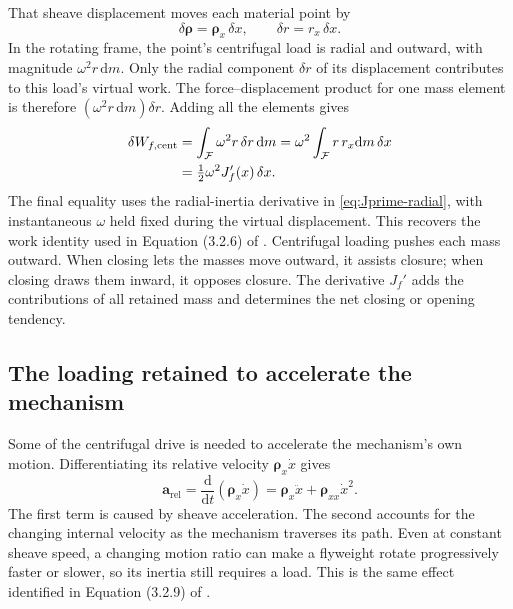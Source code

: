 \documentclass[11pt,letterpaper]{article}
\numberwithin{equation}{section}
\newcommand{\dd}{\mathrm{d}}
\newcommand{\rhoo}{\bm\rho}
\newcommand{\half}{\tfrac12}
\newcommand{\source}{\cite{formulation}}
\begin{document}
That sheave displacement moves each material point by
\begin{equation}
  \delta\rhoo=\rhoo_x\,\delta x,
  \qquad \delta r=r_x\,\delta x.
  \label{eq:virtual-displacement}
\end{equation}
In the rotating frame, the point's centrifugal load is radial and outward, with magnitude $\omega^2r\,\dd m$. Only the radial component $\delta r$ of its displacement contributes to this load's virtual work. The force--displacement product for one mass element is therefore $(\omega^2r\,\dd m)\delta r$. Adding all the elements gives
\begin{align}
  \delta W_{f,\mathrm{cent}}
    &=\int_{\mathcal F}\omega^2r\,\delta r\,\dd m
      =\omega^2\int_{\mathcal F}r\,r_x\dd m\,\delta x
      \notag\\
    &=\half\omega^2J_f'(x)\,\delta x.
      \label{eq:centrifugal-work}
\end{align}
The final equality uses the radial-inertia derivative in \cref{eq:Jprime-radial}, with instantaneous $\omega$ held fixed during the virtual displacement. This recovers the work identity used in Equation (3.2.6) of \source{}. Centrifugal loading pushes each mass outward. When closing lets the masses move outward, it assists closure; when closing draws them inward, it opposes closure. The derivative $J_f'$ adds the contributions of all retained mass and determines the net closing or opening tendency.

\subsection{The loading retained to accelerate the mechanism}

Some of the centrifugal drive is needed to accelerate the mechanism's own motion. Differentiating its relative velocity $\rhoo_x\dot x$ gives
\begin{equation}
  \bm a_{\mathrm{rel}}
    =\frac{\dd}{\dd t}(\rhoo_x\dot x)
    =\rhoo_x\ddot x+\rhoo_{xx}\dot x^2.
  \label{eq:relative-acceleration}
\end{equation}
The first term is caused by sheave acceleration. The second accounts for the changing internal velocity as the mechanism traverses its path. Even at constant sheave speed, a changing motion ratio can make a flyweight rotate progressively faster or slower, so its inertia still requires a load. This is the same effect identified in Equation (3.2.9) of \source.
\end{document}
